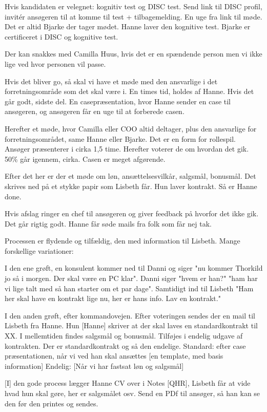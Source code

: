 Hvis kandidaten er velegnet: kognitiv test og DISC test. Send link til DISC profil, invitér ansøgeren til at komme til test + tilbagemelding.
En uge fra link til møde. Det er altid Bjarke der tager mødet. Hanne laver den kognitive test. Bjarke er certificeret i DISC og kognitive test.

Der kan snakkes med Camilla Huus, hvis det er en spændende person men vi ikke lige ved hvor personen vil passe. 

Hvis det bliver go, så skal vi have et møde med den ansvarlige i det forretningsområde som det skal være i. En times tid, holdes af Hanne.
Hvis det går godt, sidste del. En casepræsentation, hvor Hanne sender en case til ansøgeren, og ansøgeren får en uge til at forberede casen.

Herefter et møde, hvor Camilla eller COO altid deltager, plus den ansvarlige for forretningsområdet, same Hanne eller Bjarke. Det er en form for rollespil.
Ansøger præsenterer i cirka 1,5 time. 
Herefter voterer de om hvordan det gik. 50\% går igennem, cirka. Casen er meget afgørende.

Efter det her er der et møde om løn, ansættelsesvilkår, salgsmål, bonusmål. Det skrives ned på et stykke papir som Lisbeth får. Hun laver kontrakt. Så er Hanne done.

Hvis afslag ringer en chef til ansøgeren og giver feedback på hvorfor det ikke gik. Det går rigtig godt. Hanne får søde mails fra folk som får nej tak.


Processen er flydende og tilfældig, den med information til Lisbeth. 
Mange forskellige variationer:

I den ene grøft, en konsulent kommer ned til Danni og siger "nu kommer Thorkild jo så i morgen. Der skal være en PC klar". Danni siger "hvem er han?" "ham har vi lige talt med så han starter om et par dage".
Samtidigt ind til Lisbeth "Ham her skal have en kontrakt lige nu, her er hans info. Lav en kontrakt."

I den anden grøft, efter kommandovejen. Efter voteringen sendes der en mail til Lisbeth fra Hanne. Hun [Hanne] skriver at der skal laves en standardkontrakt til XX. I mellemtiden findes salgsmål og bonusmål. Tilføjes i endelig udgave af kontrakten.
Der er standardkontrakt og så den endelige. 
Standard: efter case præsentationen, når vi ved han skal ansættes [en template, med basis information]
Endelig: [Når vi har fastsat løn og salgsmål]

[I] den gode process lægger Hanne CV over i Notes [QHR], Lisbeth får at vide hvad hun skal gøre, her er salgsmålet osv. Send en PDf til ansøger, så han kan se den før den printes og sendes.

